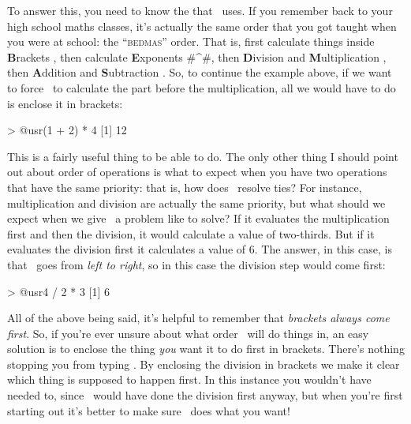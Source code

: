 To answer this, you need to know the  that \R\ uses. If you remember back to your high school maths classes, it's actually the same order that you got taught when you were at school: the ``\textsc{bedmas}'' order. That is, first calculate things inside {\bf B}rackets \rtext{()}, then calculate {\bf E}xponents \rtextverb#^#, then {\bf D}ivision \rtext{/} and {\bf M}ultiplication \rtext{*}, then {\bf A}ddition \rtext{+} and {\bf S}ubtraction \rtext{-}. So, to continue the example above, if we want to force \R\ to calculate the  part before the multiplication, all we would have to do is enclose it in brackets:
\begin{rblock1}
> @usr{(1 + 2) * 4} 
[1] 12
\end{rblock1}
This is a fairly useful thing to be able to do. The only other thing I should point out about order of operations is what to expect when you have two operations that have the same priority: that is, how does \R\ resolve ties? For instance, multiplication and division are actually the same priority, but what should we expect when we give \R\ a problem like  to solve? If it evaluates the multiplication first and then the division, it would calculate a value of two-thirds. But if it evaluates the division first it calculates a value of 6. The answer, in this case, is that \R\ goes from {\it left to right}, so in this case the division step would come first:
\begin{rblock1}
> @usr{4 / 2 * 3} 
[1] 6
\end{rblock1}

All of the above being said, it's helpful to remember that {\it brackets always come first}. So, if you're ever unsure about what order \R\ will do things in, an easy solution is to enclose the thing {\it you} want it to do first in brackets.  There's nothing stopping you from typing . By enclosing the division in brackets we make it clear which thing is supposed to happen first. In this instance you wouldn't have needed to, since \R\ would have done the division first anyway, but when you're first starting out it's better to make sure \R\ does what you want!



